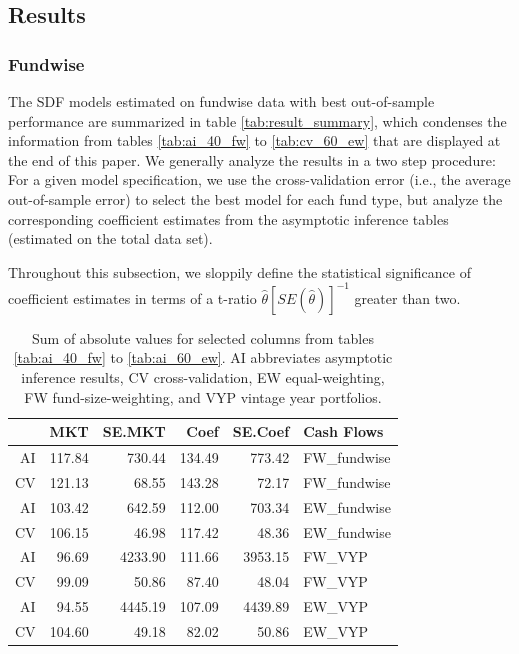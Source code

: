 \documentclass[12pt]{article}
\begin{document}
\subsection{Results}

\subsubsection{Fundwise}
\label{sec:results_fundwise}

The SDF models estimated on fundwise data with best out-of-sample performance are summarized in table \ref{tab:result_summary}, which condenses the information from tables \ref{tab:ai_40_fw} to \ref{tab:cv_60_ew} that are displayed at the end of this paper.
We generally analyze the results in a two step procedure: For a given model specification, we use the cross-validation error (i.e., the average out-of-sample error) to select the best model for each fund type, but analyze the corresponding coefficient estimates from the asymptotic inference tables (estimated on the total data set).

Throughout this subsection, we sloppily define the statistical significance of coefficient estimates in terms of a t-ratio $\hat{\theta}[SE(\hat{\theta})]^{-1}$ greater than two.




\begin{table}[ht]
	\centering
	\begin{tabular}{rrrrrl}
		& MKT & SE.MKT & Coef & SE.Coef & Cash Flows \\ 
		\hline
		\hline
		AI & 117.84 & 730.44 & 134.49 & 773.42 & FW\_fundwise \\ 
		CV & 121.13 & 68.55 & 143.28 & 72.17 & FW\_fundwise \\ 
		\hline
		AI & 103.42 & 642.59 & 112.00 & 703.34 & EW\_fundwise \\ 
		CV & 106.15 & 46.98 & 117.42 & 48.36 & EW\_fundwise \\ 
		\hline
		AI & 96.69 & 4233.90 & 111.66 & 3953.15 & FW\_VYP \\ 
		CV & 99.09 & 50.86 & 87.40 & 48.04 & FW\_VYP \\ 
		\hline
		AI & 94.55 & 4445.19 & 107.09 & 4439.89 & EW\_VYP \\ 
		CV & 104.60 & 49.18 & 82.02 & 50.86 & EW\_VYP \\ 
		\hline
		\hline
	\end{tabular}
	\caption{Sum of absolute values for selected columns from tables \ref{tab:ai_40_fw} to \ref{tab:ai_60_ew}. AI abbreviates asymptotic inference results, CV cross-validation, EW equal-weighting, FW fund-size-weighting, and VYP vintage year portfolios.} 
	\label{tab:ai_sum_abs}
\end{table}
\end{document}
